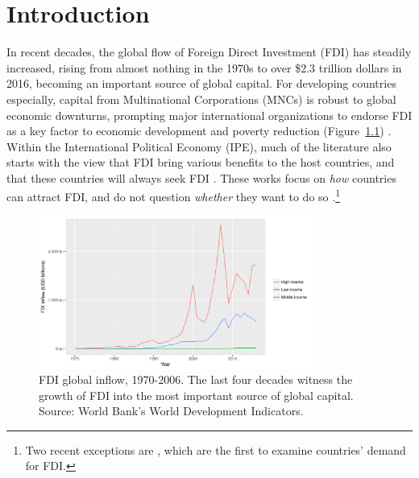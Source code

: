 \chapter{Introduction}

In recent decades, the global flow of Foreign Direct Investment (FDI) has
steadily increased, rising from almost nothing in the 1970s to over \$2.3
trillion dollars in 2016, becoming an important source of global capital. For
developing countries especially, capital from Multinational Corporations (MNCs) is robust to
global economic downturns, prompting major international
organizations to endorse FDI as a key factor to economic development and poverty reduction
(Figure~\ref{fig:globalfdi}) \citep{Mallampally1999, WorldEconomicForum2013}.
Within the International Political Economy
(IPE),  much of the literature also starts with the view that FDI bring various
benefits to the host countries, and that these countries will always seek FDI \citep{Jensen2008b}. These works focus on \textit{how} countries can attract FDI, and do
not question \textit{whether} they want to do so \citep{Jensen2003, Li2003, Li2006,
  Ahlquist2006}.\footnote{Two recent exceptions are \citet{Pinto2013,
    Pandya2016}, which are the first to examine countries' demand for FDI.} 

\begin{figure}[tbp]
  \centering
\includegraphics[width=0.8\textwidth,keepaspectratio]{../figure/global_fdi}
\caption[FDI global inflow, 1970-2006.]{FDI global inflow, 1970-2006. The last
  four decades witness the growth of FDI into the most important
  source of global capital. Source: World Bank's World Development Indicators.}
\label{fig:globalfdi}
\end{figure}

